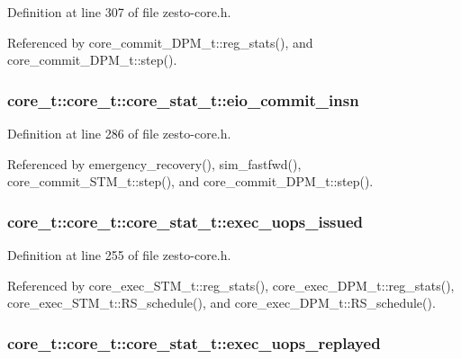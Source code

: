 Definition at line 307 of file zesto-core.h.

Referenced by core\_\-commit\_\-DPM\_\-t::reg\_\-stats(), and core\_\-commit\_\-DPM\_\-t::step().
\subsubsection[{eio\_\-commit\_\-insn}]{ core\_\-t::core\_\-t::core\_\-stat\_\-t::eio\_\-commit\_\-insn}\label{structcore__t_1_1core__stat__t_a41c519bf86d69b41a84c7253bf14276}




Definition at line 286 of file zesto-core.h.

Referenced by emergency\_\-recovery(), sim\_\-fastfwd(), core\_\-commit\_\-STM\_\-t::step(), and core\_\-commit\_\-DPM\_\-t::step().
\subsubsection[{exec\_\-uops\_\-issued}]{ core\_\-t::core\_\-t::core\_\-stat\_\-t::exec\_\-uops\_\-issued}\label{structcore__t_1_1core__stat__t_104d279c5246d5f2c940f18dfcdb3908}




Definition at line 255 of file zesto-core.h.

Referenced by core\_\-exec\_\-STM\_\-t::reg\_\-stats(), core\_\-exec\_\-DPM\_\-t::reg\_\-stats(), core\_\-exec\_\-STM\_\-t::RS\_\-schedule(), and core\_\-exec\_\-DPM\_\-t::RS\_\-schedule().
\subsubsection[{exec\_\-uops\_\-replayed}]{ core\_\-t::core\_\-t::core\_\-stat\_\-t::exec\_\-uops\_\-replayed}\label{structcore__t_1_1core__stat__t_b005a5cbe605689ec13b19d653471fcf}




